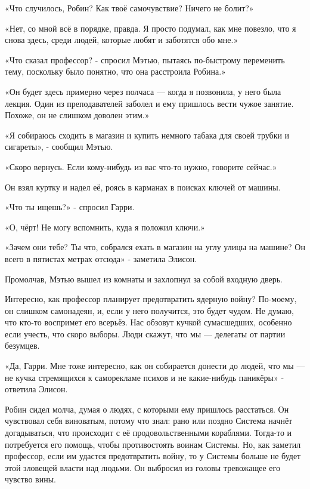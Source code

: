 \documentclass[a4paper,12pt]{book}
\begin{document}
\par
«Что случилось, Робин? Как твоё самочувствие? Ничего не болит?»
\par
«Нет, со мной всё в порядке, правда. Я просто подумал, как мне повезло, что я снова здесь, среди людей, которые любят и заботятся обо мне.»
\par
«Что сказал профессор? - спросил Мэтью, пытаясь по-быстрому переменить тему, поскольку было понятно, что она расстроила Робина.»
\par
«Он будет здесь примерно через полчаса — когда я позвонила, у него была лекция. Один из преподавателей заболел и ему пришлось вести чужое занятие. Похоже, он не слишком доволен этим.»
\par
«Я собираюсь сходить в магазин и купить немного табака для своей трубки и сигареты», - сообщил Мэтью.
\par
«Скоро вернусь. Если кому-нибудь из вас что-то нужно, говорите сейчас.»
\par
Он взял куртку и надел её, роясь в карманах в поисках ключей от машины.
\par
«Что ты ищешь?» - спросил Гарри.
\par
«О, чёрт! Не могу вспомнить, куда я положил ключи.»
\par
«Зачем они тебе? Ты что, собрался ехать в магазин на углу улицы на машине? Он всего в пятистах метрах отсюда» - заметила Элисон.
\par
Промолчав, Мэтью вышел из комнаты и захлопнул за собой входную дверь.
\par
Интересно, как профессор планирует предотвратить ядерную войну? По-моему, он слишком самонадеян, и, если у него получится, это будет чудом. Не думаю, что кто-то воспримет его всерьёз. Нас обзовут кучкой сумасшедших, особенно если учесть, что скоро выборы. Люди скажут, что мы — делегаты от партии безумцев.
\par
«Да, Гарри. Мне тоже интересно, как он собирается донести до людей, что мы — не кучка стремящихся к саморекламе психов и не какие-нибудь паникёры» - ответила Элисон.
\par
Робин сидел молча, думая о людях, с которыми ему пришлось расстаться. Он чувствовал себя виноватым, потому что знал: рано или поздно Система начнёт догадываться, что происходит с её продовольственными кораблями. Тогда-то и потребуется его помощь, чтобы противостоять воинам Системы. Но, как заметил профессор, если им удастся предотвратить войну, то у Системы больше не будет этой зловещей власти над людьми. Он выбросил из головы тревожащее его чувство вины.\\
\end{document}
